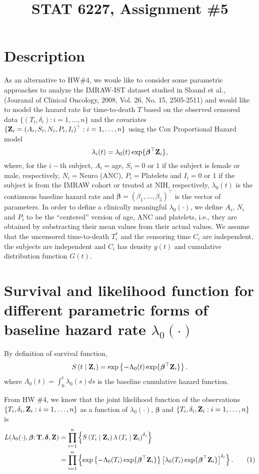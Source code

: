 \documentclass[11pt]{article}
\newcommand{\numit}{\stepcounter{equation}\tag{\theequation}}
\newcommand{\cS}[1]{S \left( #1 \mid \bZ_i \right)}
\newcommand{\clamb}[1]{\lambda \left( #1 \mid \bZ_i \right)}
\newcommand{\bT}{{\bf{T}}}
\newcommand{\bZ}{{\bf{Z}}}
\newcommand{\bdelta}{{\bm \delta}}
\newcommand{\bbeta}{{\bm \beta}}
\begin{document}
\title{STAT 6227, Assignment \#5}
\maketitle

\section{Description}
As an alternative to HW\#4, we woule like to consider some parametric approaches
to analyze the IMRAW-IST dataset studied in Sloand et al., (Jouranal of
Clinical Oncology, 2008, Vol. 26, No. 15, 2505-2511) and would like to model the
hazard rate for time-to-death $T$ based on the observed censored data
$\{(T_i,\delta_i):i=1,\dots,n\}$ and the covariates $\{\bZ_i =
(A_i,S_i,N_i,P_i,I_i)^{\top}:i=1,\dots,n\}$ using the Cox Proportional Hazard
model
\begin{equation}
\label{eq:CoxPH}
\lambda_i(t) = \lambda_0(t)\exp\{\bbeta^{\top}\bZ_i\},
\end{equation}
where, for the $i-$th subject, $A_i=$age, $S_i=0$ or $1$ if the subject is
female or male, respectively, $N_i=$Neuro (ANC), $P_i=$Platelets and $I_i=0$ or
$1$ if the subject is from the IMRAW cohort or treated at NIH, respectively,
$\lambda_0(t)$ is the continuous baseline hazard rate and $\bbeta =
(\beta_1,\dots,\beta_5)^{\top}$ is the vector of parameters.
In order to define a clinically meaningful $\lambda_0(\cdot)$, we define $A_i$,
$N_i$ and $P_i$ to be the ``centered'' version of age, ANC and platelets, i.e.,
they are obtained by substracting their mean values from their actual values.
We assume that the uncensored time-to-death $T_i^{*}$ and the censoring time $C_i$ are independent,
the subjects are independent and $C_i$ has density $g(t)$ and cumulative
distribution function $G(t)$.

\section{Survival and likelihood function for different parametric forms of baseline hazard rate $\lambda_{0}(\cdot)$}
By definition of survival function, 
\begin{equation}
\label{eq:SurvFunc}
\cS{t} = \exp \left\{ -\Lambda_0(t) \exp\{\bbeta^{\top}\bZ_i\} \right\}.
\end{equation}
where $\Lambda_0(t) = \int_0^t \lambda_0(s)ds$ is the baseline cumulative hazard function.

From HW \#4, we know that the joint likelihood function of the observations
$\{T_i, \delta_i,\bZ_i:i=1,\dots,n\}$ as a function of $\lambda_0(\cdot)$,
$\bbeta$ and $\{T_i, \delta_i,\bZ_i:i=1,\dots,n\}$ is
\begin{align*}
L(\lambda_0(\cdot),\bbeta;\bT,\bdelta,\bZ) &= \prod_{i=1}^n \left\{ \cS{T_i}\clamb{T_i}^{\delta_i} \right\}\\
  &= \prod_{i=1}^n \left\{\exp \left\{ -\Lambda_0(T_i) \exp\{\bbeta^{\top}\bZ_i\} \right\} \left[ \lambda_0(T_i)\exp\{\bbeta^{\top}\bZ_i\} \right]^{\delta_i} \right\}.
  \numit\label{eq:Lik}
\end{align*}
\end{document}
